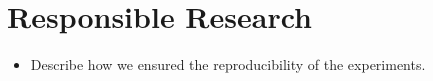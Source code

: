 \section{Responsible Research}
\label{sec: responsible-research}

\begin{itemize}
    \item Describe how we ensured the reproducibility of the experiments.
\end{itemize}